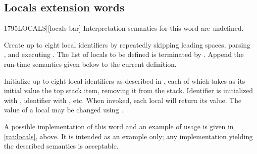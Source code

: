 \subsection{Locals extension words} %
\extended

\begin{worddef}[LOCALS]{1795}{LOCALS|}[locals-bar]
\interpret
	Interpretation semantics for this word are undefined.

\compile

	Create up to eight local identifiers by repeatedly skipping
	leading spaces, parsing , and executing
	. The list of locals to be defined
	is terminated by \param{|}. Append the run-time semantics given
	below to the current definition.

\runtime

	Initialize up to eight local identifiers as described in
	, each of which takes as its
	initial value the top stack item, removing it from the stack.
	Identifier  is initialized with ,
	identifier  with , etc. When invoked,
	each local will return its value. The value of a local may be
	changed using .

	\begin{defer}
	\rationale %
		A possible implementation of this word and an example of usage
		is given in \ref{rat:locals}, above. It is intended as an
		example only; any implementation yielding the described
		semantics is acceptable.
	\end{defer}
\end{worddef}
